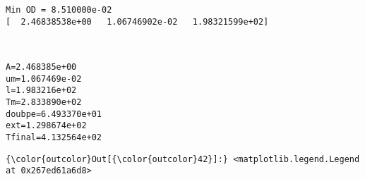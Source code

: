 \documentclass[11pt]{article}
\begin{document}
    \begin{Verbatim}[commandchars=\\\{\}]
Min OD = 8.510000e-02
[  2.46838538e+00   1.06746902e-02   1.98321599e+02]

    \end{Verbatim}

    \begin{center}
    \end{center}
    { \hspace*{\fill} \\}
    
    \begin{Verbatim}[commandchars=\\\{\}]
A=2.468385e+00
um=1.067469e-02
l=1.983216e+02
Tm=2.833890e+02
doubpe=6.493370e+01
ext=1.298674e+02
Tfinal=4.132564e+02

    \end{Verbatim}

            \begin{Verbatim}[commandchars=\\\{\}]
{\color{outcolor}Out[{\color{outcolor}42}]:} <matplotlib.legend.Legend at 0x267ed61a6d8>
\end{Verbatim}
        
    \begin{center}
    \end{center}
    { \hspace*{\fill} \\}
    
    \begin{center}
    \end{center}
    { \hspace*{\fill} \\}
    
\end{document}
